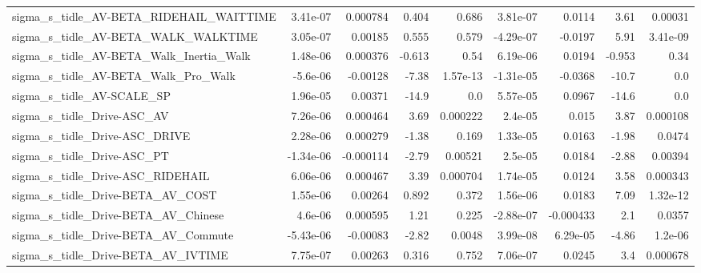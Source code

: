 \begin{tabular}{lrrrrrrrr}
sigma\_s\_tidle\_AV-BETA\_RIDEHAIL\_WAITTIME            &    3.41e-07 &     0.000784 &    0.404 &    0.686 &   3.81e-07 &      0.0114 &         3.61 &       0.00031 \\
sigma\_s\_tidle\_AV-BETA\_WALK\_WALKTIME                &    3.05e-07 &      0.00185 &    0.555 &    0.579 &  -4.29e-07 &     -0.0197 &         5.91 &      3.41e-09 \\
sigma\_s\_tidle\_AV-BETA\_Walk\_Inertia\_Walk            &    1.48e-06 &     0.000376 &   -0.613 &     0.54 &   6.19e-06 &      0.0194 &       -0.953 &          0.34 \\
sigma\_s\_tidle\_AV-BETA\_Walk\_Pro\_Walk                &    -5.6e-06 &     -0.00128 &    -7.38 & 1.57e-13 &  -1.31e-05 &     -0.0368 &        -10.7 &           0.0 \\
sigma\_s\_tidle\_AV-SCALE\_SP                          &    1.96e-05 &      0.00371 &    -14.9 &      0.0 &   5.57e-05 &      0.0967 &        -14.6 &           0.0 \\
sigma\_s\_tidle\_Drive-ASC\_AV                         &    7.26e-06 &     0.000464 &     3.69 & 0.000222 &    2.4e-05 &       0.015 &         3.87 &      0.000108 \\
sigma\_s\_tidle\_Drive-ASC\_DRIVE                      &    2.28e-06 &     0.000279 &    -1.38 &    0.169 &   1.33e-05 &      0.0163 &        -1.98 &        0.0474 \\
sigma\_s\_tidle\_Drive-ASC\_PT                         &   -1.34e-06 &    -0.000114 &    -2.79 &  0.00521 &    2.5e-05 &      0.0184 &        -2.88 &       0.00394 \\
sigma\_s\_tidle\_Drive-ASC\_RIDEHAIL                   &    6.06e-06 &     0.000467 &     3.39 & 0.000704 &   1.74e-05 &      0.0124 &         3.58 &      0.000343 \\
sigma\_s\_tidle\_Drive-BETA\_AV\_COST                   &    1.55e-06 &      0.00264 &    0.892 &    0.372 &   1.56e-06 &      0.0183 &         7.09 &      1.32e-12 \\
sigma\_s\_tidle\_Drive-BETA\_AV\_Chinese                &     4.6e-06 &     0.000595 &     1.21 &    0.225 &  -2.88e-07 &   -0.000433 &          2.1 &        0.0357 \\
sigma\_s\_tidle\_Drive-BETA\_AV\_Commute                &   -5.43e-06 &     -0.00083 &    -2.82 &   0.0048 &   3.99e-08 &    6.29e-05 &        -4.86 &       1.2e-06 \\
sigma\_s\_tidle\_Drive-BETA\_AV\_IVTIME                 &    7.75e-07 &      0.00263 &    0.316 &    0.752 &   7.06e-07 &      0.0245 &          3.4 &      0.000678 \\

\end{tabular}
